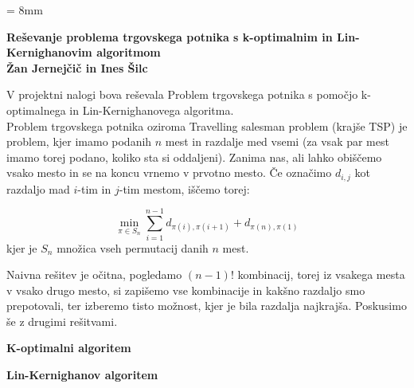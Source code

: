 \documentclass[a4paper,12pt]{article}
\begin{document}
\parindent = 8mm
\begin{center}
\textbf{Reševanje problema trgovskega potnika s k-optimalnim in Lin-Kernighanovim algoritmom}\\
\vspace{5 mm}
\textbf{Žan Jernejčič in Ines Šilc}
\end{center}

V projektni nalogi bova reševala Problem trgovskega potnika s pomočjo k-optimalnega in Lin-Kernighanovega algoritma.\\

Problem trgovskega potnika oziroma Travelling salesman problem (krajše TSP) je problem, kjer imamo podanih $n$ mest in razdalje med vsemi (za vsak par mest imamo torej podano, koliko sta si oddaljeni). Zanima nas, ali lahko obiščemo vsako mesto in se na koncu vrnemo v prvotno mesto. Če označimo $d_{i, j}$ kot razdaljo mad $i$-tim in $j$-tim mestom, iščemo torej:

$$
\min_{\pi \in S_n} \sum\limits_{i=1}^{n-1} d_{\pi (i), \pi (i+1)} + d_{\pi (n), \pi (1)}
$$
 kjer je $S_n$ množica vseh permutacij danih $n$ mest.
 
Naivna rešitev je očitna, pogledamo $(n-1)!$ kombinacij, torej iz vsakega mesta v vsako drugo mesto, si zapišemo vse kombinacije in kakšno razdaljo smo prepotovali, ter izberemo tisto možnost, kjer je bila razdalja najkrajša. Poskusimo še z drugimi rešitvami.

\vspace{5 mm}
\textbf{K-optimalni algoritem}




\vspace{5 mm}
\textbf{Lin-Kernighanov algoritem}
\end{document}
